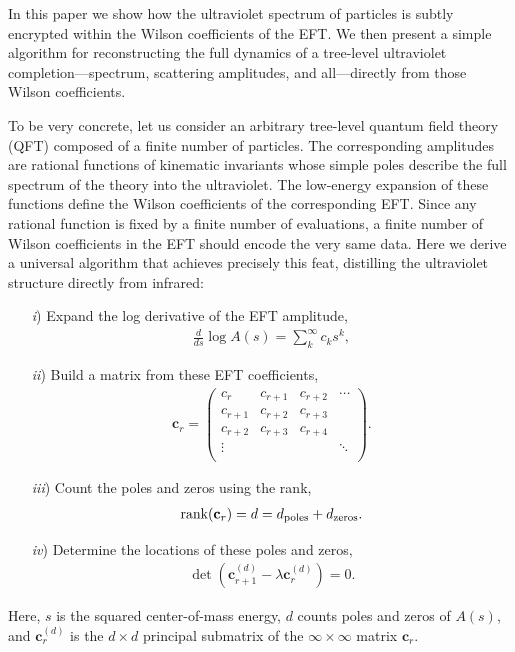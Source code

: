 \documentclass[twocolumn,english,aps,prd,reprint,floatfix,notitlepage,footinbib,preprintnumbers,superscriptaddress,longbibliography]{revtex4-1}
\newcommand{\be}{\begin{equation}}
\newcommand{\ee}{\end{equation}}
\newcommand{\eq}[2]{\be\begin{aligned}#1 \label{#2}\end{aligned}\ee}
\begin{document}
In this paper we show how the ultraviolet spectrum of particles is subtly encrypted within the Wilson coefficients of the EFT.  We then present a simple algorithm for reconstructing the full dynamics of a tree-level ultraviolet completion---spectrum, scattering amplitudes, and all---directly from those Wilson coefficients.


To be very concrete, let us consider an arbitrary tree-level quantum field theory (QFT) composed of a finite number of particles.  The corresponding amplitudes are rational functions of kinematic invariants whose simple poles describe the full spectrum of the theory into the ultraviolet.  The low-energy expansion of these functions define the Wilson coefficients of the corresponding EFT.
Since any rational function is fixed by a finite number of evaluations, a finite number of Wilson coefficients in the EFT should encode the very same data.
Here we derive a universal algorithm that achieves precisely this feat, distilling the ultraviolet structure directly from infrared:
\begin{itemize}

\item[{\it i})] Expand the log derivative of the EFT amplitude,
\eq{
 \frac{d}{ds} \log A(s) = \sum_{k}^\infty c_k s^k,
 }{}

\item[{\it ii})] Build a matrix from these EFT coefficients,
\eq{
\mathbf{c}_r =  \left(
\begin{array}{cccc}
c_{r} & c_{r+1} & c_{r+2} & \cdots  \\
c_{r+1} & c_{r+2} & c_{r+3}  &\\
c_{r+2} & c_{r+3}  & c_{r+4} &  \\
\vdots &  &  &\ddots \\
\end{array}
\right).
}{cr}

\item[{\it iii})] Count the poles and zeros using the rank,
\eq{
\textrm{rank}(\mathbf{c}_r) =d= d_{\rm poles} + d_{\rm zeros}.
}{rank_condition}

\item[{\it iv})] Determine the locations of these poles and zeros,
\eq{
\det\left({\mathbf{c}^{(d)}_{r+1}} - \lambda \mathbf{c}_{r}^{(d)}\right)  =0.
}{char_eq}

\end{itemize}
Here, $s$  is the squared center-of-mass energy, $d$ counts poles and zeros of $A(s)$, and $\mathbf{c}_r^{(d)}$ is the $d\times d$ principal submatrix of the $\infty\times \infty$ matrix  $\mathbf{c}_r$.
\end{document}
